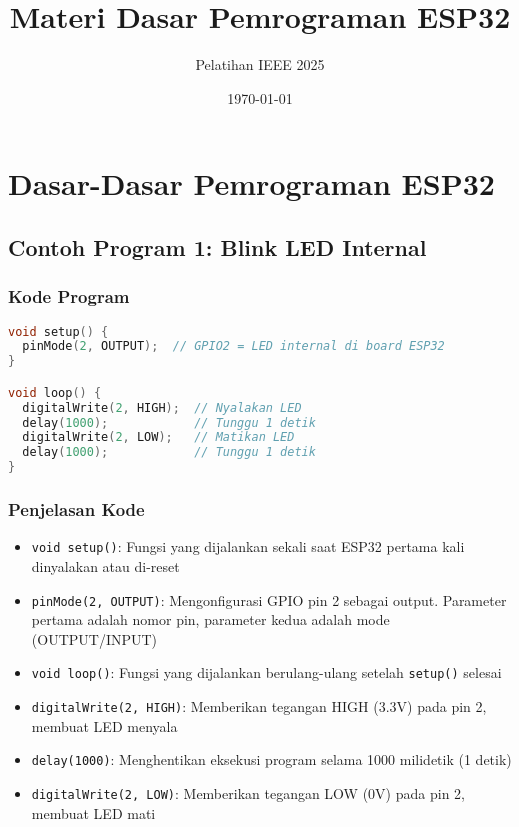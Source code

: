 \documentclass[12pt,a4paper]{article}
\title{\textbf{Materi Dasar Pemrograman ESP32}}
\author{Pelatihan IEEE 2025}
\date{\today}
\begin{document}
\maketitle
\tableofcontents
\newpage

\section{Dasar-Dasar Pemrograman ESP32}

\subsection{Contoh Program 1: Blink LED Internal}

\subsubsection{Kode Program}
\begin{lstlisting}[language=C++, caption={Program Blink LED}]
void setup() {
  pinMode(2, OUTPUT);  // GPIO2 = LED internal di board ESP32
}

void loop() {
  digitalWrite(2, HIGH);  // Nyalakan LED
  delay(1000);            // Tunggu 1 detik
  digitalWrite(2, LOW);   // Matikan LED
  delay(1000);            // Tunggu 1 detik
}
\end{lstlisting}

\subsubsection{Penjelasan Kode}
\begin{itemize}
    \item \texttt{void setup()}: Fungsi yang dijalankan sekali saat ESP32 pertama kali dinyalakan atau di-reset
    \item \texttt{pinMode(2, OUTPUT)}: Mengonfigurasi GPIO pin 2 sebagai output. Parameter pertama adalah nomor pin, parameter kedua adalah mode (OUTPUT/INPUT)
    \item \texttt{void loop()}: Fungsi yang dijalankan berulang-ulang setelah \texttt{setup()} selesai
    \item \texttt{digitalWrite(2, HIGH)}: Memberikan tegangan HIGH (3.3V) pada pin 2, membuat LED menyala
    \item \texttt{delay(1000)}: Menghentikan eksekusi program selama 1000 milidetik (1 detik)
    \item \texttt{digitalWrite(2, LOW)}: Memberikan tegangan LOW (0V) pada pin 2, membuat LED mati
\end{itemize}
\end{document}
